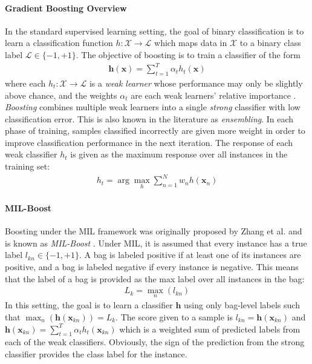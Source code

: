 \paragraph{Gradient Boosting Overview}
In the standard supervised learning setting, the goal of binary classification is to learn a classification function $h:\mathcal{X} \rightarrow \mathcal{L}$ which maps data in $\mathcal{X}$ to a binary class label $\mathcal{L} \in \{-1,+1\}$.  The objective of boosting is to train a classifier of the form
\begin{align}
	\bm{h}(\bm{x}) = \sum_{t=1}^{T}\alpha_{t}h_{t}(\bm{x})
\end{align}
\noindent
where each $h_{t}:\mathcal{X} \rightarrow \mathcal{L}$ is a \textit{weak learner} whose performance may only be slightly above chance, and the weights $\alpha_{t}$ are each weak learners' relative importance \citep{Babenko2008MIBoosting}.  \textit{Boosting} combines multiple weak learners into a single \textit{strong} classifier with low classification error.  This is also known in the literature as \textit{ensembling}.  In each phase of training, samples classified incorrectly are given more weight in order to improve classification performance in the next iteration.  The response of each weak classifier $h_{t}$ is given as the maximum response over all instances in the training set:
\begin{align}
	h_{t} = \arg \max_{h} \sum_{n=1}^{N}w_{n}h(\bm{x}_{n})
\end{align}

\paragraph{MIL-Boost}
Boosting under the MIL framework was originally proposed by Zhang et al. and is known as \textit{MIL-Boost} \citep{Zhang2006MIBoosting}.  Under MIL, it is assumed that every instance has a true label $l_{kn} \in \{ -1,+1 \}$.  A bag is labeled positive if at least one of its instances are positive, and a bag is labeled negative if every instance is negative.  This means that the label of a bag is provided as the max label over all instances in the bag:
\begin{align}
	L_{k} = \max_{n}(l_{kn})
\end{align}
\noindent
In this setting, the goal is to learn a classifier $\bm{h}$ using only bag-level labels such that $\max_{n}(\bm{h}(\bm{x}_{kn})) = L_{k}$. The score given to a sample is $l_{kn} = \bm{h}(\bm{x}_{kn})$ and $\bm{h}(\bm{x}_{kn}) = \sum_{t=1}^{T}\alpha_{t}h_{t}(\bm{x}_{kn})$ which is a weighted sum of predicted labels from each of the weak classifiers.  Obviously, the sign of the prediction from the strong classifier provides the class label for the instance.

